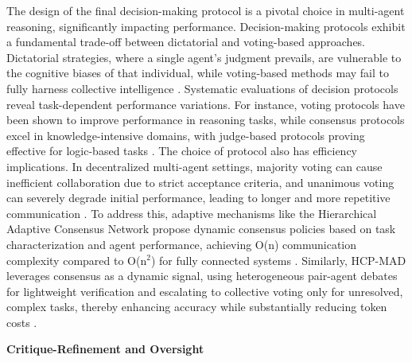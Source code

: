 \documentclass[11pt]{article}
\begin{document}
The design of the final decision-making protocol is a pivotal choice in multi-agent reasoning, significantly impacting performance. Decision-making protocols exhibit a fundamental trade-off between dictatorial and voting-based approaches. Dictatorial strategies, where a single agent's judgment prevails, are vulnerable to the cognitive biases of that individual, while voting-based methods may fail to fully harness collective intelligence \cite{ref38}. Systematic evaluations of decision protocols reveal task-dependent performance variations. For instance, voting protocols have been shown to improve performance in reasoning tasks, while consensus protocols excel in knowledge-intensive domains, with judge-based protocols proving effective for logic-based tasks \cite{ref208,ref24}. The choice of protocol also has efficiency implications. In decentralized multi-agent settings, majority voting can cause inefficient collaboration due to strict acceptance criteria, and unanimous voting can severely degrade initial performance, leading to longer and more repetitive communication \cite{ref209}. To address this, adaptive mechanisms like the Hierarchical Adaptive Consensus Network propose dynamic consensus policies based on task characterization and agent performance, achieving O(n) communication complexity compared to O(n\(^2\)) for fully connected systems \cite{ref51}. Similarly, HCP-MAD leverages consensus as a dynamic signal, using heterogeneous pair-agent debates for lightweight verification and escalating to collective voting only for unresolved, complex tasks, thereby enhancing accuracy while substantially reducing token costs \cite{ref210}.

\textbf{Critique-Refinement and Oversight}
\end{document}

